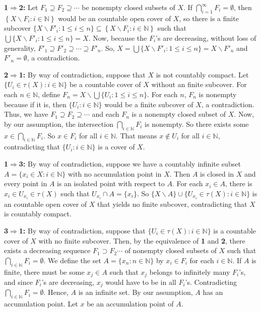 \documentclass{article}
\begin{document}
			  \textbf{1$\Rightarrow $2:} Let $F_1\supseteq F_2 \supseteq \cdots $ be nonempty closed subsets of $X$. If $\bigcap_{i=1}^{\infty} F_i =\emptyset$, then $\left\{X\backslash F_i : i\in \mathbb{N} \right\} $ would be an countable open cover of $X$, so there is a finite subcover $\{X\backslash F'_i : 1\leq i \leq n\} \subseteq \left\{X\backslash F_i : i\in \mathbb{N}\right\}$ such that $\bigcup \{X\backslash F'_i : 1\leq i \leq n\}= X$. Now, because the $F_i$'s are decreasing, without loss of generality, $F'_1 \supseteq F'_2 \supseteq \cdots \supseteq F'_n$. So, $X=\bigcup \{X\backslash F'_i : 1\leq i \leq n\}= X\backslash F'_n$ and $F'_n=\emptyset$, a contradiction.


			  \vskip 10pt

			  \textbf{2$\Rightarrow $1:} By way of contradiction, suppose that $X$ is not countably compact.
			  Let $\{U_i\in \tau(X): i\in \mathbb{N}\}$ be a countable cover of $X$ without an finite subcover. For each $n\in \mathbb{N}$, define $F_n=X\backslash \bigcup\{U_i: 1\leq i\leq n\}.$ For each $n$, $F_n$ is nonempty because if it is, then $\{U_i: i\in \mathbb{N}\}$ would be a finite subcover of $X$, a contradiction. Thus, we have $F_1\supseteq F_2 \supseteq \cdots $ and each $F_n$ is a nonempty closed subset of $X$. 
			  \vskip 10pt
			  Now, by our assumption, the intersection $\bigcap_{i \in \mathbb{N}} F_i$ is nonempty. So there exists some $x\in \bigcap_{i\in \mathbb{N}} F_i$. So $x\in F_i$ for all $i\in \mathbb{N}$. That means $x\notin U_i$ for all $i\in \mathbb{N}$, contradicting that $\{U_i: i\in \mathbb{N}\}$ is a cover of $X$. 

			  \vskip 15pt




			  \textbf{1$\Rightarrow $3:} By way of contradiction, suppose we have a countably infinite subset $A=\{x_i\in X: i\in \mathbb{N}\}$ with no accumulation point in $X$. Then $A$ is closed in $X$ and every point in  $A$ is an isolated point with respect to $A$. For each $x_i\in A$, there is $x_i \in U_{x_i}\in \tau(X)$ such that $U_{x_i} \cap A = \{x_i\}$. So $\{X\backslash A\} \cup \{U_{x_i} \in \tau(X): i\in \mathbb{N}\}$ is an countable open cover of $X$ that yields no finite subcover, contradicting that $X$ is countably compact. 

			  \vskip 15pt


			  \textbf{3$\Rightarrow$1:} By way of contradiction, suppose that  $\{U_i\in \tau(X): i\in \mathbb{N}\}$ is a countable cover of $X$ with no finite subcover. Then, by the equivalence of \textbf{1} and \textbf{2}, there exists a decreasing sequence $F_1\supset F_2\cdots $ of nonempty closed subsets of $X$ such that $\bigcap_{i\in \mathbb{N}} F_i =\emptyset$. We define the set $A=\{x_n: n\in \mathbb{N}\}$ by $x_i\in F_i$ for each $i\in \mathbb{N}$. If $A$ is finite, there must be some $x_j\in A$ such that $x_j$ belongs to infinitely many $F_i$'s, and since $F_i$'s are decreasing, $x_j$ would have to be in all $F_i$'s. Contradicting $\bigcap_{i\in \mathbb{N}} F_i=\emptyset$. 
			  Hence, $A$ is an infinite set. By our assumption, $A$ has an accumulation point. Let $x$ be an accumulation point of $A$.
\end{document}
